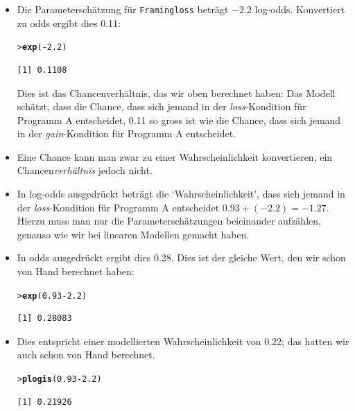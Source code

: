 \documentclass[oneside, 10pt]{book}\usepackage[]{graphicx}\usepackage[]{xcolor}
\makeatletter
\newcommand{\hlnum}[1]{\textcolor[rgb]{0.686,0.059,0.569}{#1}}%
\newcommand{\hlopt}[1]{\textcolor[rgb]{0,0,0}{#1}}%
\newcommand{\hlstd}[1]{\textcolor[rgb]{0.345,0.345,0.345}{#1}}%
\newcommand{\hlkwd}[1]{\textcolor[rgb]{0.737,0.353,0.396}{\textbf{#1}}}%
\newenvironment{kframe}{%
 \def\at@end@of@kframe{}%
 \ifinner\ifhmode%
  \def\at@end@of@kframe{\end{minipage}}%
  \begin{minipage}{\columnwidth}%
 \fi\fi%
 \def\FrameCommand##1{\hskip\@totalleftmargin \hskip-\fboxsep
 \colorbox{shadecolor}{##1}\hskip-\fboxsep
     \hskip-\linewidth \hskip-\@totalleftmargin \hskip\columnwidth}%
 \MakeFramed {\advance\hsize-\width
   \@totalleftmargin\z@ \linewidth\hsize
   \@setminipage}}%
 {\par\unskip\endMakeFramed%
 \at@end@of@kframe}
\newenvironment{knitrout}{}{} %
\makeatother
\begin{document}
\begin{itemize}
\item Die Parameterschätzung für \texttt{Framingloss}
beträgt $-2.2$ log-odds. Konvertiert zu odds ergibt dies
0.11:
\begin{knitrout}
\color{fgcolor}\begin{kframe}
\begin{alltt}
\hlstd{> }\hlkwd{exp}\hlstd{(}\hlopt{-}\hlnum{2.2}\hlstd{)}
\end{alltt}
\begin{verbatim}
[1] 0.1108
\end{verbatim}
\end{kframe}
\end{knitrout}
Dies ist das Chancenverhältnis, das wir oben berechnet haben:
Das Modell schätzt, dass die Chance, dass sich jemand in der
\textit{loss}-Kondition für Programm A entscheidet,
0.11 so gross ist wie die Chance, dass sich jemand in der
\textit{gain}-Kondition für Programm A entscheidet.

\item Eine Chance kann man zwar zu einer Wahrscheinlichkeit
konvertieren, ein Chancen\emph{verhältnis} jedoch nicht.

\item In log-odds ausgedrückt beträgt die `Wahrscheinlichkeit',
dass sich jemand in der \textit{loss}-Kondition für Programm
A entscheidet $0.93 + (-2.2) = -1.27$. Hierzu muss man nur die
Parameterschätzungen beieinander aufzählen, genauso wie wir
bei linearen Modellen gemacht haben.

\item In odds ausgedrückt ergibt dies 0.28. Dies
ist der gleiche Wert, den wir schon von Hand berechnet haben:
\begin{knitrout}
\color{fgcolor}\begin{kframe}
\begin{alltt}
\hlstd{> }\hlkwd{exp}\hlstd{(}\hlnum{0.93} \hlopt{-} \hlnum{2.2}\hlstd{)}
\end{alltt}
\begin{verbatim}
[1] 0.28083
\end{verbatim}
\end{kframe}
\end{knitrout}

\item Dies entspricht einer modellierten Wahrscheinlichkeit von 0.22;
das hatten wir auch schon von Hand berechnet.
\begin{knitrout}
\color{fgcolor}\begin{kframe}
\begin{alltt}
\hlstd{> }\hlkwd{plogis}\hlstd{(}\hlnum{0.93} \hlopt{-} \hlnum{2.2}\hlstd{)}
\end{alltt}
\begin{verbatim}
[1] 0.21926
\end{verbatim}
\end{kframe}
\end{knitrout}
\end{itemize}
\end{document}
